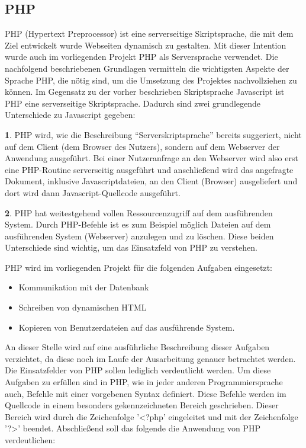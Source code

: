 \subsection{PHP}
\label{sec:Php}

PHP (Hypertext Preprocessor) ist eine serverseitige Skriptsprache, die mit dem Ziel entwickelt wurde Webseiten dynamisch
zu gestalten.
Mit dieser Intention wurde auch im vorliegenden Projekt PHP als Serversprache verwendet. Die nachfolgend beschriebenen
Grundlagen vermitteln die wichtigsten Aspekte der Sprache PHP, die nötig sind, um die Umsetzung des Projektes
nachvollziehen zu können.
Im Gegensatz zu der vorher beschrieben Skriptsprache Javascript ist PHP eine serverseitige Skriptsprache. Dadurch sind
zwei grundlegende Unterschiede zu Javascript gegeben:

\textbf{1}. PHP wird, wie die Beschreibung "`Serverskriptsprache"' bereits suggeriert, nicht auf dem Client (dem Browser des Nutzers),
sondern auf dem Webserver der Anwendung ausgeführt. Bei einer Nutzeranfrage an den Webserver wird also erst eine PHP-Routine serverseitig ausgeführt und anschließend wird das angefragte Dokument, inklusive
Javascriptdateien, an den Client (Browser) ausgeliefert und dort wird dann Javascript-Quellcode ausgeführt.

\textbf{2}. PHP hat weitestgehend vollen Ressourcenzugriff auf dem ausführenden System. Durch PHP-Befehle ist es zum Beispiel möglich Dateien auf dem ausführenden System (Webserver) anzulegen und zu löschen.
Diese beiden Unterschiede sind wichtig, um das Einsatzfeld von PHP zu verstehen.

PHP wird im vorliegenden Projekt für die folgenden Aufgaben eingesetzt:
\begin{itemize}
  \item Kommunikation mit der Datenbank
  \item Schreiben von dynamischen HTML
  \item Kopieren von Benutzerdateien auf das ausführende System.
\end{itemize}

An dieser Stelle wird auf eine ausführliche Beschreibung dieser Aufgaben verzichtet, da diese noch im Laufe der Ausarbeitung genauer betrachtet werden. Die Einsatzfelder von PHP sollen lediglich verdeutlicht werden.
Um diese Aufgaben zu erfüllen sind in PHP, wie in jeder anderen Programmiersprache auch, Befehle mit einer vorgebenen
Syntax definiert. Diese Befehle werden im Quellcode in einem besonders gekennzeichneten Bereich geschrieben. Dieser
Bereich wird durch die Zeichenfolge '<?php' eingeleitet und mit der Zeichenfolge '?>' beendet.
Abschließend soll das folgende  die Anwendung von PHP verdeutlichen:

